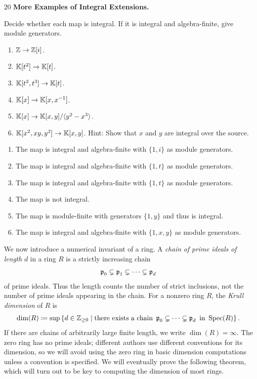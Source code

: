 \documentclass[Notebook.tex]{subfiles}
\begin{document}
\newpage

\begin{problem}{20}
    \textbf{More Examples of Integral Extensions.} 
    
    Decide whether each map is integral. If it is integral and algebra-finite, give module generators.
    \begin{enumerate}
        \item $\mathbb Z\to \mathbb Z[i]$.
        \item $\mathbb K[t^2]\to \mathbb K[t]$.
        \item $\mathbb K[t^2,t^3]\to \mathbb K[t]$.
        \item $\mathbb K[x]\to \mathbb K[x,x^{-1}]$.
        \item $\mathbb K[x]\to \mathbb K[x,y]/\langle y^2-x^3\rangle$.
        \item $\mathbb K[x^2,xy,y^2]\to \mathbb K[x,y]$. Hint: Show that $x$ and $y$ are integral over the source.
    \end{enumerate}    
\end{problem}

\begin{solution}
    \bbni
    \begin{enumerate}
        \item The map is integral and algebra-finite with $\{1, i\}$ as module generators. 
        \item The map is integral and algebra-finite with $\{1, t\}$ as module generators. 
        \item The map is integral and algebra-finite with $\{1, t\}$ as module generators. 
        \item The map is not integral. 
        \item The map is module-finite with generators $\{1, y\}$ and thus is integral. 
        \item The map is integral and algebra-finite with $\{1, x, y\}$ as module generators. 
    \end{enumerate}
\end{solution}

\newpage 


\hrulefill

We now introduce a numerical invariant of a ring. A \emph{chain of prime ideals of length $d$} in a ring $R$ is a strictly increasing chain
\[
\operatorname{\mathfrak{p}}_0\subsetneq \operatorname{\mathfrak{p}}_1\subsetneq \cdots \subsetneq \operatorname{\mathfrak{p}}_d
\]
of prime ideals. Thus the length counts the number of strict inclusions, not the number of prime ideals appearing in the chain. For a nonzero ring $R$, the \emph{Krull dimension} of $R$ is
\[
\dim(R)
\coloneqq
\sup\left\{d\in\mathbb Z_{\geq 0}\;\middle|\;\text{there exists a chain }\operatorname{\mathfrak{p}}_0\subsetneq\cdots\subsetneq\operatorname{\mathfrak{p}}_d\text{ in }\operatorname{Spec}(R)\right\}.
\]
If there are chains of arbitrarily large finite length, we write $\dim(R)=\infty$. The zero ring has no prime ideals; different authors use different conventions for its dimension, so we will avoid using the zero ring in basic dimension computations unless a convention is specified. We will eventually prove the following theorem, which will turn out to be key to computing the dimension of most rings.
\end{document}
